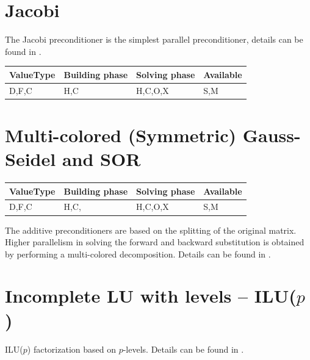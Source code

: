 \section{Jacobi}

The Jacobi preconditioner is the simplest parallel preconditioner, details can be found in \cite{SAAD, templates, Demmel}.

\begin{table}[H]
\begin{tabular}{l|l|l|l}
\multicolumn{1}{c|}{ValueType} & Building phase & Solving phase & Available \\ \hline
D,F,C                          & H,C            & H,C,O,X       & S,M      
\end{tabular}
\end{table}





\section{Multi-colored (Symmetric) Gauss-Seidel and SOR}

\begin{table}[H]
\begin{tabular}{l|l|l|l}
\multicolumn{1}{c|}{ValueType} & Building phase & Solving phase & Available \\ \hline
D,F,C                          & H,C,           & H,C,O,X       & S,M      
\end{tabular}
\end{table}


The additive preconditioners are based on the splitting of the original matrix. Higher parallelism in solving the forward and backward substitution is obtained by performing a multi-colored decomposition. Details can be found in \cite{Lukarski2012, SAAD}.






\section{Incomplete LU with levels -- ILU($p$)}

ILU($p$) factorization based on $p$-levels. Details can be found in \cite{SAAD}.

